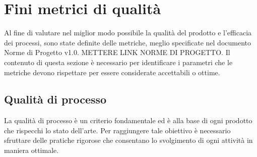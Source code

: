 \section{Fini metrici di qualità}
Al fine di valutare nel miglior modo possibile la qualità del prodotto e l'efficacia dei processi, sono state definite delle metriche, meglio specificate nel documento Norme di Progetto v1.0. METTERE LINK NORME DI PROGETTO. Il contenuto di questa sezione è necessario per identificare i parametri che le metriche devono rispettare per essere considerate accettabili o ottime. 
\subsection{Qualità di processo}
La qualità di processo è un criterio fondamentale ed è alla base di ogni prodotto
che rispecchi lo stato dell'arte. Per raggiungere tale obiettivo è necessario 
sfruttare delle pratiche rigorose che consentano lo svolgimento di ogni attività
in maniera ottimale.
